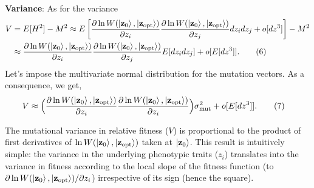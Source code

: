 \documentclass[11pt]{article}
\begin{document}
\textbf{Variance}: As for the variance
\begin{align*}
    V &= E[H^2] - M^2  \approx  E\left[\frac{\partial \ln W(\ket{\mathbf{z}_0}, \ket{\mathbf{z}_{\mathrm{opt}}})}{\partial z_i} \frac{\partial \ln W(\ket{\mathbf{z}_0}, \ket{\mathbf{z}_{\mathrm{opt}}})}{\partial z_j} dz_i dz_j + o[dz^3]\right] - M^2 \\
    & \approx \frac{\partial \ln W(\ket{\mathbf{z}_0}, \ket{\mathbf{z}_{\mathrm{opt}}})}{\partial z_i} \frac{\partial \ln W(\ket{\mathbf{z}_0}, \ket{\mathbf{z}_{\mathrm{opt}}})}{\partial z_j} E[dz_i dz_j] + o[E[dz^3]]. \tag{6}
\end{align*}
Let's impose the multivariate normal distribution for the mutation vectors. As a consequence, we get,
    \begin{align*}
        V & \approx  \Big( \frac{\partial \ln W(\ket{\mathbf{z}_0}, \ket{\mathbf{z}_{\mathrm{opt}}})}{\partial z_i} \frac{\partial \ln W(\ket{\mathbf{z}_0}, \ket{\mathbf{z}_{\mathrm{opt}}})}{\partial z_i} \Big) \sigma_{\mathrm{mut}}^2 + o[E[dz^3]]. \tag{7}
    \end{align*}


  
    The mutational variance in relative fitness (\( V\)) is proportional to the product of first derivatives of \(\ln W(\ket{\mathbf{z}_0}, \ket{\mathbf{z}_{\mathrm{opt}}})\) taken at \(\ket{\mathbf{z}_0}\). This result is intuitively simple: the variance in the underlying phenotypic traits (\(z_i\)) translates into the variance in fitness according to the local slope of the fitness function (to \(\partial \ln W(\ket{\mathbf{z}_0}, \ket{\mathbf{z}_{\mathrm{opt}}})/\partial z_i\)) irrespective of its sign (hence the square). 
\end{document}
